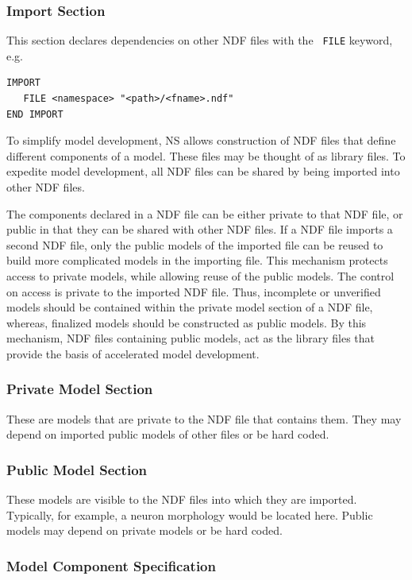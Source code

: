 \documentclass[12pt]{article}
\begin{document}
\subsubsection{Import Section}

This section declares dependencies on other NDF files with the {\tt
  FILE} keyword, e.g.
\begin{verbatim}
IMPORT
   FILE <namespace> "<path>/<fname>.ndf"
END IMPORT
\end{verbatim}

To simplify model development, NS allows construction of NDF files
that define different components of a model.  These files may be thought of as
library files.  To expedite model development, all NDF files
can be shared by being imported into other NDF files.

The components declared in a NDF file can be either private to that
NDF file, or public in that they can be shared with other NDF files.
If a NDF file imports a second NDF file, only the public models of the
imported file can be reused to build more complicated models in the
importing file.  This mechanism protects access to private models,
while allowing reuse of the public models.  The control on access is
private to the imported NDF file.  Thus, incomplete or unverified
models should be contained within the private model section of a NDF
file, whereas, finalized models should be constructed as public
models.  By this mechanism, NDF files containing public models, act as the
library files that provide the basis of accelerated model development.

\subsubsection{Private Model Section}

These are models that are private to the NDF file that contains them.
They may depend on imported public models of other files or be hard
coded.

\subsubsection{Public Model Section}

These models are visible to the NDF files into which they are
imported.  Typically, for example, a neuron morphology would be
located here.  Public models may depend on private models or be hard
coded.

\subsubsection{Model Component Specification}
\end{document}
